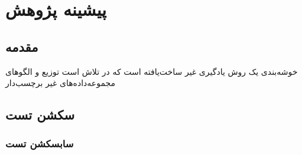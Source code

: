\chapter{پیشینه پژوهش}

\section{مقدمه}
  خوشه‌بندی یک روش یادگیری غیر ساخت‌یافته  است که در تلاش است توزیع و الگوهای مجموعه‌داده‌های غیر برچسب‌دار  

\section{سکشن تست}

\subsection{سابسکشن تست}